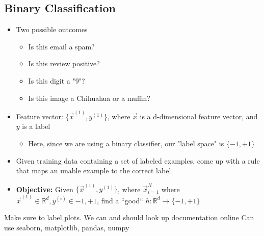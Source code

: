 \documentclass[10pt, oneside]{article}
\newcommand{\R}{\mathbb{R}}
\begin{document}
\subsection{Binary Classification}
\begin{itemize}
    \item Two possible outcomes
    \begin{itemize}
        \item Is this email a spam?
        \item Is this review positive?
        \item Is this digit a "9"?
        \item Is this image a Chihuahua or a muffin?
    \end{itemize}
    \item Feature vector: $\{\vec{x}^{(1)}, y^{(1)}\}$, where $\vec{x}$ is a d-dimensional feature vector, and $y$ is a label
    \begin{itemize}
        \item Here, since we are using a binary classifier, our "label space" is $\{-1,+1\}$
    \end{itemize}
    \item Given training data containing a set of labeled examples, come up with a rule that maps an unable example to the correct label
    \item \textbf{Objective:} Given $\{\vec{x}^{(1)}, y^{(1)}\}$, where $\vec{x}^N _{i=1}$ where $\vec{x}^{(1)}\in \R^d, y^{(i)}\in {-1,+1}$, find a ``good`` $h:\R^d \rightarrow \{-1,+1\}$

\end{itemize}

Make sure to label plots.
We can and should look up documentation online
Can use seaborn, matplotlib, pandas, numpy
\end{document}
